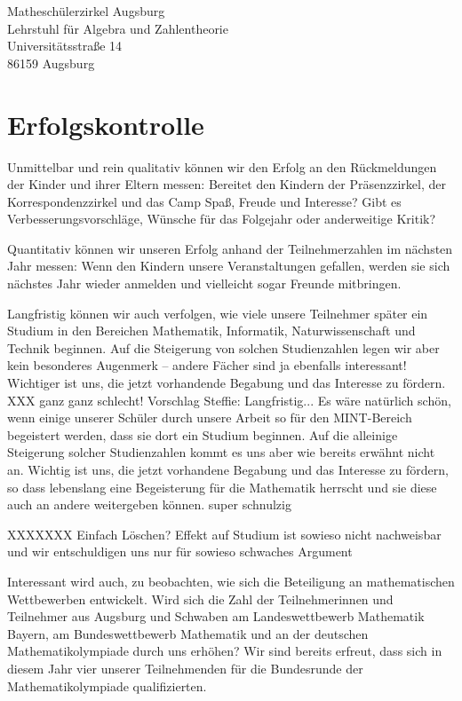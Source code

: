 \documentclass[12pt]{zettel}
\begin{document}
\begin{tabbing}
  Matheschülerzirkel Augsburg \\
  Lehrstuhl für Algebra und Zahlentheorie \\
  Universitätsstraße 14 \\
  86159 Augsburg
\end{tabbing}


\section{Erfolgskontrolle}

Unmittelbar und rein qualitativ können wir den Erfolg an den Rückmeldungen der
Kinder und ihrer Eltern messen: Bereitet den Kindern der Präsenzzirkel, der
Korrespondenzzirkel und das Camp Spaß, Freude und Interesse? Gibt es
Verbesserungsvorschläge, Wünsche für das Folgejahr oder anderweitige Kritik?

Quantitativ können wir unseren Erfolg anhand der Teilnehmerzahlen im nächsten
Jahr messen: Wenn den Kindern unsere Veranstaltungen gefallen, werden sie sich
nächstes Jahr wieder anmelden und vielleicht sogar Freunde mitbringen.

Langfristig können wir auch verfolgen, wie viele unsere Teilnehmer später ein
Studium in den Bereichen Mathematik, Informatik, Naturwissenschaft und Technik
beginnen. Auf die Steigerung von solchen Studienzahlen legen wir aber kein
besonderes Augenmerk -- andere Fächer sind ja ebenfalls interessant! Wichtiger
ist uns, die jetzt vorhandende Begabung und das Interesse zu fördern. XXX ganz
ganz schlecht!
Vorschlag Steffie:
Langfristig... Es wäre natürlich schön, wenn einige unserer Schüler durch
unsere Arbeit so für den MINT-Bereich begeistert werden, dass sie dort ein
Studium beginnen. Auf die alleinige Steigerung solcher Studienzahlen kommt es
uns aber wie bereits erwähnt nicht an. Wichtig ist uns, die jetzt vorhandene
Begabung und das Interesse zu fördern, so dass lebenslang eine Begeisterung für
die Mathematik herrscht und sie diese auch an andere weitergeben können.
super schnulzig

XXXXXXX Einfach Löschen? Effekt auf Studium ist sowieso nicht nachweisbar und wir entschuldigen uns nur für sowieso schwaches Argument

Interessant wird auch, zu beobachten, wie sich die Beteiligung an
mathematischen Wettbewerben entwickelt. Wird sich die Zahl der
Teilnehmerinnen und Teilnehmer aus Augsburg und Schwaben am Landeswettbewerb
Mathematik Bayern, am Bundeswettbewerb Mathematik und an der deutschen
Mathematikolympiade durch uns erhöhen? Wir sind bereits erfreut,
dass sich in diesem Jahr vier unserer Teilnehmenden für die
Bundesrunde der Mathematikolympiade qualifizierten.
\end{document}
